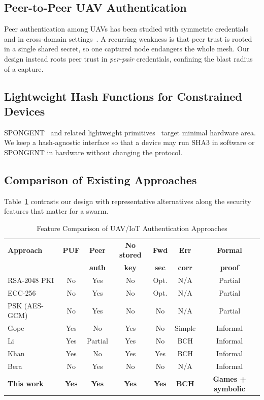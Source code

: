 \documentclass[11pt,a4paper]{article}
\begin{document}
\subsection{Peer-to-Peer UAV Authentication}
Peer authentication among UAVs has been studied with symmetric
credentials~\cite{peer2peer_auth} and in cross-domain
settings~\cite{puf_uav_cross_domain,puf_6g_uav}. A recurring weakness is that
peer trust is rooted in a single shared secret, so one captured node endangers
the whole mesh. Our design instead roots peer trust in \emph{per-pair}
credentials, confining the blast radius of a capture.

\subsection{Lightweight Hash Functions for Constrained Devices}
SPONGENT~\cite{spongent_original} and related lightweight
primitives~\cite{lightweight_crypto_evaluation} target minimal hardware area.
We keep a hash-agnostic interface so that a device may run SHA3 in software or
SPONGENT in hardware without changing the protocol.

\subsection{Comparison of Existing Approaches}

Table~\ref{tab:related_comparison} contrasts our design with representative
alternatives along the security features that matter for a swarm.

\begin{table}[H]
\centering
\caption{Feature Comparison of UAV/IoT Authentication Approaches}
\label{tab:related_comparison}
\small
\begin{tabular}{@{}p{3.0cm}cccccc@{}}
\toprule
\textbf{Approach} & \textbf{PUF} & \textbf{Peer} & \textbf{No stored} & \textbf{Fwd} & \textbf{Err} & \textbf{Formal} \\
                  &              & \textbf{auth} & \textbf{key}       & \textbf{sec} & \textbf{corr} & \textbf{proof} \\
\midrule
RSA-2048 PKI & No & Yes & No & Opt. & N/A & Partial \\
ECC-256 & No & Yes & No & Opt. & N/A & Partial \\
PSK (AES-GCM) & No & Yes & No & No & N/A & Partial \\
Gope~\cite{puf_lightweight_uav} & Yes & No & Yes & No & Simple & Informal \\
Li~\cite{puf_uav_cross_domain} & Yes & Partial & Yes & No & BCH & Informal \\
Khan~\cite{puf_6g_uav} & Yes & No & Yes & Yes & BCH & Informal \\
Bera~\cite{peer2peer_auth} & No & Yes & No & No & N/A & Informal \\
\textbf{This work} & \textbf{Yes} & \textbf{Yes} & \textbf{Yes} & \textbf{Yes} & \textbf{BCH} & \textbf{Games + symbolic} \\
\bottomrule
\end{tabular}
\normalsize
\end{table}
\end{document}
